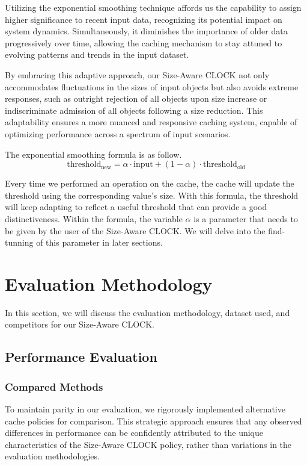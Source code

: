 \documentclass[journal,10.5pt,onecolumn]{IEEEtran}
\begin{document}
Utilizing the exponential smoothing technique affords us the capability to assign higher significance to recent input data, recognizing its potential impact on system dynamics. Simultaneously, it diminishes the importance of older data progressively over time, allowing the caching mechanism to stay attuned to evolving patterns and trends in the input dataset.

By embracing this adaptive approach, our Size-Aware CLOCK not only accommodates fluctuations in the sizes of input objects but also avoids extreme responses, such as outright rejection of all objects upon size increase or indiscriminate admission of all objects following a size reduction. This adaptability ensures a more nuanced and responsive caching system, capable of optimizing performance across a spectrum of input scenarios. 

The exponential smoothing formula is as follow.
\[
\text{threshold}_{\text{new}} = \alpha \cdot \text{input} + (1 - \alpha) \cdot \text{threshold}_{\text{old}}
\]

Every time we performed an operation on the cache, the cache will update the threshold using the corresponding value's size. With this formula, the threshold will keep adapting to reflect a useful threshold that can provide a good distinctiveness.
Within the formula, the variable $\alpha$ is a parameter that needs to be given by the user of the Size-Aware CLOCK. We will delve into the find-tunning of this parameter in later sections.


\section{Evaluation Methodology}
In this section, we will discuss the evaluation methodology, dataset used, and competitors for our Size-Aware CLOCK.

\subsection{Performance Evaluation}
\subsubsection{Compared Methods}
To maintain parity in our evaluation, we rigorously implemented alternative cache policies for comparison. This strategic approach ensures that any observed differences in performance can be confidently attributed to the unique characteristics of the Size-Aware CLOCK policy, rather than variations in the evaluation methodologies.
\end{document}
